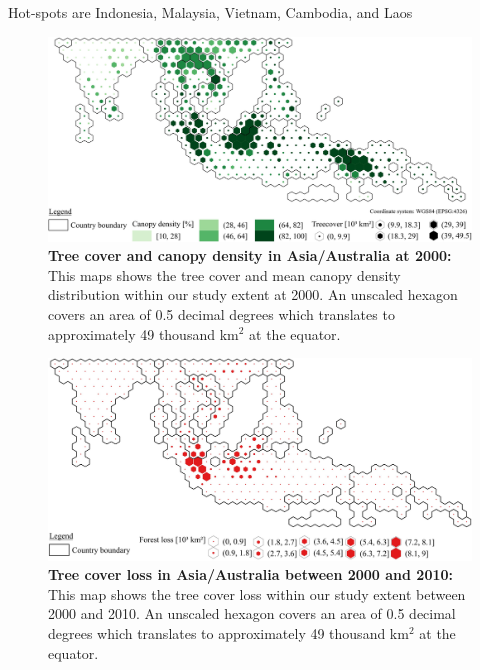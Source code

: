 			Hot-spots are Indonesia, Malaysia, Vietnam, Cambodia, and Laos
			\begin{figure}[ht]
				\centering
				\includegraphics[scale=1]{img/asia_treecover_frameless}
				\caption[Tree cover and canopy density in Asia/Australia at 2000]{\textbf{Tree cover and canopy density in Asia/Australia at 2000:} This maps shows the tree cover and mean canopy density distribution within our study extent at 2000. An unscaled hexagon covers an area of 0.5 decimal degrees which translates to approximately 49 thousand km$^2$ at the equator.}
				\label{fig:asia_tree_cover}
			\end{figure}
			\begin{figure}[ht]
				\centering
				\includegraphics[scale=1]{img/asia_loss_frameless}
				\caption[Tree cover loss in Asia/Australia between 2000 and 2010]{\textbf{Tree cover loss in Asia/Australia between 2000 and 2010:} This map shows the tree cover loss within our study extent between 2000 and 2010. An unscaled hexagon covers an area of 0.5 decimal degrees which translates to approximately 49 thousand km$^2$ at the equator.}
				\label{fig:asia_loss}
			\end{figure}

